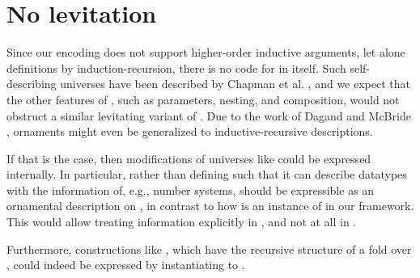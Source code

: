 \section{No levitation}
Since our encoding does not support higher-order inductive arguments, let alone definitions by induction-recursion, there is no code for  in itself. Such self-describing universes have been described by Chapman et al. \cite{levitation}, and we expect that the other features of , such as parameters, nesting, and composition, would not obstruct a similar levitating variant of . Due to the work of Dagand and McBride \cite{orntrans}, ornaments might even be generalized to inductive-recursive descriptions.

If that is the case, then modifications of universes like  could be expressed internally. In particular, rather than defining  such that it can describe datatypes with the information of, e.g., number systems,  should be expressible as an ornamental description on , in contrast to how  is an instance of  in our framework. This would allow treating information explicitly in , and not at all in .

Furthermore, constructions like , which have the recursive structure of a fold over , could indeed be expressed by instantiating  to .




